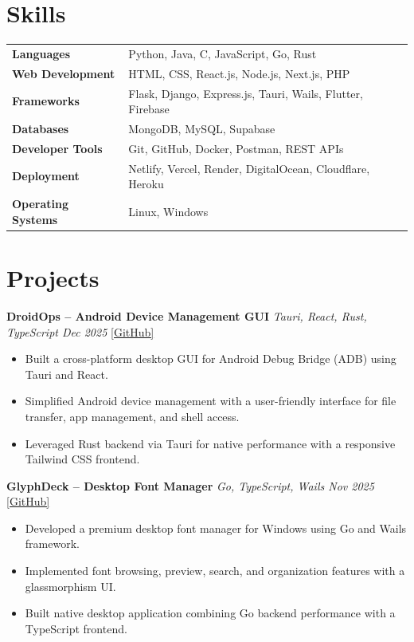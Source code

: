 \documentclass[10pt, a4paper]{article}
\begin{document}
\section*{Skills}

\renewcommand{\arraystretch}{1.05}
\begin{tabular}{@{} >{\bfseries}p{3.8cm} p{13cm} @{}}
Languages           & Python, Java, C, JavaScript, Go, Rust \\
Web Development     & HTML, CSS, React.js, Node.js, Next.js, PHP \\
Frameworks          & Flask, Django, Express.js, Tauri, Wails, Flutter, Firebase \\
Databases           & MongoDB, MySQL, Supabase \\
Developer Tools     & Git, GitHub, Docker, Postman, REST APIs \\
Deployment          & Netlify, Vercel, Render, DigitalOcean, Cloudflare, Heroku \\
Operating Systems   & Linux, Windows \\
\end{tabular}

\section*{Projects}

\textbf{DroidOps -- Android Device Management GUI} \hfill \textit{Tauri, React, Rust, TypeScript \quad Dec 2025} \quad \href{https://github.com/bbinxx/droidops}{[GitHub]}
\begin{itemize}
\item Built a cross-platform desktop GUI for Android Debug Bridge (ADB) using Tauri and React.
\item Simplified Android device management with a user-friendly interface for file transfer, app management, and shell access.
\item Leveraged Rust backend via Tauri for native performance with a responsive Tailwind CSS frontend.
\end{itemize}

\vspace{3pt}

\textbf{GlyphDeck -- Desktop Font Manager} \hfill \textit{Go, TypeScript, Wails \quad Nov 2025} \quad \href{https://github.com/bbinxx/GlyphDeck}{[GitHub]}
\begin{itemize}
\item Developed a premium desktop font manager for Windows using Go and Wails framework.
\item Implemented font browsing, preview, search, and organization features with a glassmorphism UI.
\item Built native desktop application combining Go backend performance with a TypeScript frontend.
\end{itemize}
\end{document}
